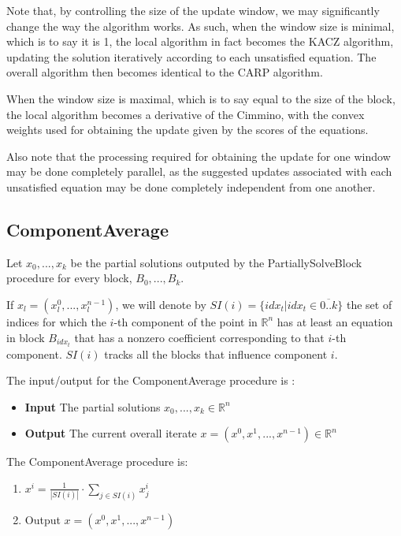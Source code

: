 \documentclass[a4paper,twoside,10pt]{report}
\begin{document}
	Note that, by controlling the size of the update window, we may significantly change the way the algorithm works. 
	As such, when the window size is minimal, which is to say it is 1, the local algorithm in fact becomes the KACZ algorithm, 
updating the solution iteratively according to each unsatisfied equation. The overall algorithm then becomes identical to the CARP algorithm.

	When the window size is maximal, which is to say equal to the size of the block, the local algorithm becomes a derivative of the Cimmino, 
with the convex weights used for obtaining the update given by the scores of the equations.

	Also note that the processing required for obtaining the update for one window may be done completely parallel, as the suggested updates 
associated with each unsatisfied equation may be done completely independent from one another. 
	
	\clearpage
		
	\subsection{ComponentAverage}
	
		Let \(x_0, ..., x_k\) be the partial solutions outputed by the PartiallySolveBlock procedure for every block, \(B_0, ..., B_k\). 

		If \(x_l = (x^0_l, ..., x^{n-1}_l)\), we will denote by \(SI(i) = \{idx_t| idx_t \in\overline{0..k}\}\) the set of indices for which the \(i\)-th component of the 
point in \(\mathbb{R} ^n\) has at least an equation in block \(B_{idx_t}\) that has a nonzero coefficient corresponding to that \(i\)-th component. \(SI(i)\) tracks all the 
blocks that influence component \(i\).

	The input/output for the ComponentAverage procedure is :
	
	\begin{itemize}
		\item \textbf{Input} The partial solutions \(x_0, ..., x_k \in \mathbb{R} ^n\)
		\item \textbf{Output} The current overall iterate \(x = (x^0, x^1,..., x^{n-1})\in \mathbb{R} ^n\)
	\end{itemize}
	
	The ComponentAverage procedure is:
	
	\begin{enumerate}
		\item \(x^i = \frac{1}{|SI(i)|} \cdot \sum_{j\in SI(i)} {x^i_j}\)
		\item Output \(x = (x^0, x^1, ..., x^{n-1})\)
	\end{enumerate}		
	
\end{document}
